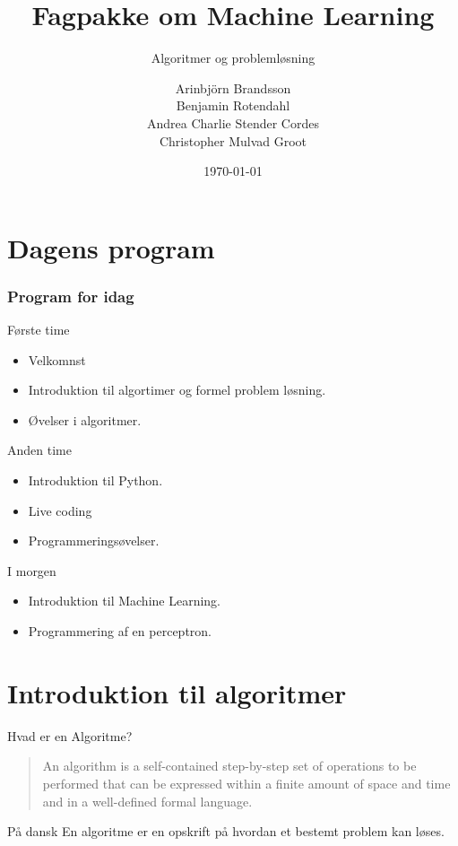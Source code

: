 \documentclass[12pt,t]{beamer}
\title{Fagpakke om Machine Learning}
\subtitle{Algoritmer og problemløsning}
\author{
        Arinbjörn Brandsson \\
        Benjamin Rotendahl  \\
        Andrea Charlie Stender Cordes \\
        Christopher Mulvad Groot\\
}
\date[]{\today}
\begin{document}
\frame[plain]{\titlepage}
 \frame{\tableofcontents}

\section{Dagens program}

\begin{frame}
    \frametitle{Program for idag}
    \begin{block}{Første time}
        \begin{itemize}
            \item Velkomnst
            \item Introduktion til algortimer og formel problem løsning.
            \item Øvelser i algoritmer.
        \end{itemize}
    \end{block}
    \pause{}
    \begin{block}{Anden time}
        \begin{itemize}
            \item Introduktion til Python.
            \item Live coding
            \item Programmeringsøvelser.
        \end{itemize}
    \end{block}
    \pause{}
    \begin{block}{I morgen}
        \begin{itemize}
            \item Introduktion til Machine Learning.
            \item Programmering af en perceptron.
        \end{itemize}
    \end{block}
\end{frame}


\section{Introduktion til algoritmer}
    \begin{frame}[c]{Hvad er en Algoritme?}
        \begin{quote}
            An algorithm is a self-contained step-by-step set of operations to
            be performed that can be expressed within a finite amount of space
            and time and in a well-defined formal language.
        \end{quote}
        \pause{}
        \begin{block}{På dansk}
            En algoritme er en \alert{opskrift} på hvordan et bestemt problem
            kan løses.
        \end{block}
    \end{frame}
\end{document}
